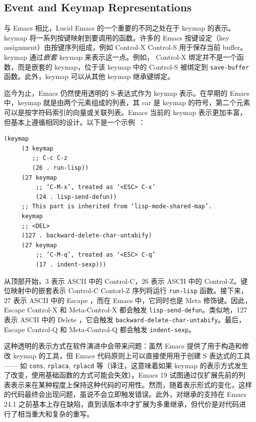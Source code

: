 \documentclass[format=acmsmall,screen]{acmart}
\begin{document}
\subsection{Event and Keymap Representations}
\label{sec:keymaps}

与 Emacs 相比，Lucid Emacs 的一个重要的不同之处在于 keymap 的表示。keymap 将一系列按键映射到要调用的函数。许多的 Emacs 按键设定（key assignment）由按键序列组成，例如 Control-X Control-S 用于保存当前 buffer。keymap 通过\emph{嵌套} keymap 来表示这一点。例如， Control-X 绑定并不是一个函数，而是嵌套的 keymap，位于该 keymap 中的 Control-S 被绑定到 \texttt{save-buffer} 函数。此外，keymap 可以从其他 keymap 继承键绑定。

迄今为止，Emacs 仍然使用透明的 S-表达式作为 keymap 表示。在早期的 Emacs 中，keymap 就是由两个元素组成的列表，其 car 是 keymap 的符号，第二个元素可以是按字符码索引的向量或关联列表。Emacs 当前的 keymap 表示更加丰富，但基本上遵循相同的设计。以下是一个示例~\cite{ELispManual2018}：
\begin{Verbatim}[samepage=true]
    (keymap
     (3 keymap
        ;; C-c C-z
        (26 . run-lisp))
     (27 keymap
         ;; ‘C-M-x’, treated as ‘<ESC> C-x’
         (24 . lisp-send-defun))
     ;; This part is inherited from ‘lisp-mode-shared-map’.
     keymap
     ;; <DEL>
     (127 . backward-delete-char-untabify)
     (27 keymap
         ;; ‘C-M-q’, treated as ‘<ESC> C-q’
         (17 . indent-sexp)))
\end{Verbatim}
从顶部开始，3 表示 ASCII 中的 Control-C，26 表示 ASCII 中的 Control-Z。键位映射中的嵌套表示 Control-C Contorl-Z 序列将运行 \texttt{run-lisp} 函数。接下来，27 表示 ASCII 中的 Escape ，而在 Emacs 中，它同时也是 Meta 修饰键。因此， Escape Control-X 和 Meta-Control-X 都会触发 \texttt{lisp-send-defun}。类似地，127 表示 ASCII 中的 Delete ，它会触发 \texttt{backward-delete-char-untabify}。最后， Escape Control-Q 和 Meta-Control-Q 都会触发 \texttt{indent-sexp}。

这种透明的表示方式在软件演进中会带来问题：虽然 Emacs 提供了用于构造和修改 keymap 的工具，但 Emacs 代码原则上可以直接使用用于创建 S 表达式的工具 —— 如 \texttt{cons}, \texttt{rplaca}, \texttt{rplacd} 等（译注，这意味着如果 keymap 的表示方式发生了改变，使用基础函数的方式可能会失效）。Emacs 19 试图通过仅扩展先前的列表表示来在某种程度上保持这种代码的可用性。然而，随着表示形式的变化，这样的代码最终会出现问题，虽说不会立即触发错误。此外，对继承的支持在 Emacs 24.1 之前基本上存在缺陷，直到该版本中才扩展为多重继承，但代价是对代码进行了相当重大和复杂的重写。
\end{document}
